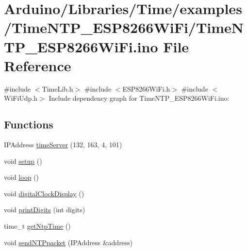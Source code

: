 \hypertarget{_time_n_t_p___e_s_p8266_wi_fi_8ino}{}\section{Arduino/\+Libraries/\+Time/examples/\+Time\+N\+T\+P\+\_\+\+E\+S\+P8266\+Wi\+Fi/\+Time\+N\+T\+P\+\_\+\+E\+S\+P8266\+Wi\+Fi.ino File Reference}
\label{_time_n_t_p___e_s_p8266_wi_fi_8ino}
{\ttfamily \#include $<$Time\+Lib.\+h$>$}\newline
{\ttfamily \#include $<$E\+S\+P8266\+Wi\+Fi.\+h$>$}\newline
{\ttfamily \#include $<$Wi\+Fi\+Udp.\+h$>$}\newline
Include dependency graph for Time\+N\+T\+P\+\_\+\+E\+S\+P8266\+Wi\+Fi.\+ino\+:
\subsection*{Functions}
\begin{DoxyCompactItemize}
\item 
I\+P\+Address \hyperlink{_time_n_t_p___e_s_p8266_wi_fi_8ino_a692f19597ee783ed4d1c0b2ad126d20e}{time\+Server} (132, 163, 4, 101)
\item 
void \hyperlink{_time_n_t_p___e_s_p8266_wi_fi_8ino_a4fc01d736fe50cf5b977f755b675f11d}{setup} ()
\item 
void \hyperlink{_time_n_t_p___e_s_p8266_wi_fi_8ino_afe461d27b9c48d5921c00d521181f12f}{loop} ()
\item 
void \hyperlink{_time_n_t_p___e_s_p8266_wi_fi_8ino_a01f3a72442d58926459c48afce4746e7}{digital\+Clock\+Display} ()
\item 
void \hyperlink{_time_n_t_p___e_s_p8266_wi_fi_8ino_a772afab0396032477ec7b01d14c774b2}{print\+Digits} (int digits)
\item 
time\+\_\+t \hyperlink{_time_n_t_p___e_s_p8266_wi_fi_8ino_a42ab384e77148282f4730ec6c68ac2a3}{get\+Ntp\+Time} ()
\item 
void \hyperlink{_time_n_t_p___e_s_p8266_wi_fi_8ino_a8ae1129fe8eab322ead67eaa83384ebc}{send\+N\+T\+Ppacket} (I\+P\+Address \&address)
\end{DoxyCompactItemize}
